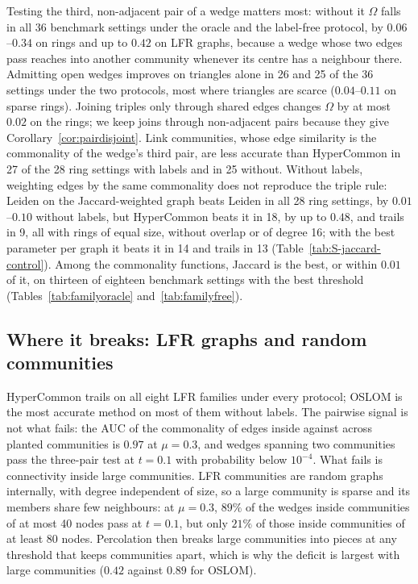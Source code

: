 Testing the third, non-adjacent pair of a wedge matters most: without it $\Omega$ falls
in all 36 benchmark settings under the oracle and the label-free protocol, by
$0.06$--$0.34$ on rings and up to $0.42$ on LFR graphs, because a wedge whose two edges
pass reaches into another community whenever its centre has a neighbour there. Admitting
open wedges improves on triangles alone in 26 and 25 of the 36 settings under the two
protocols, most where triangles are scarce ($0.04$--$0.11$ on sparse rings). Joining
triples only through shared edges changes $\Omega$ by at most $0.02$ on the rings; we
keep joins through non-adjacent pairs because they give
Corollary~\ref{cor:pairdisjoint}. Link communities, whose edge similarity is the
commonality of the wedge's third pair, are less accurate than HyperCommon in 27 of the 28 ring settings with labels and in 25 without. Without labels, weighting edges by the same commonality does not reproduce the triple rule: Leiden on the Jaccard-weighted graph beats Leiden in all 28 ring settings, by $0.01$--$0.10$ without labels, but HyperCommon beats it in 18, by up to $0.48$, and trails in 9, all with rings of equal size, without overlap or of degree 16; with the best parameter per graph it beats it in 14 and trails in 13 (Table~\ref{tab:S-jaccard-control}). Among the commonality functions, Jaccard is the
best, or within $0.01$ of it, on thirteen of eighteen benchmark settings with the best
threshold (Tables~\ref{tab:familyoracle} and~\ref{tab:familyfree}).

\subsection{Where it breaks: LFR graphs and random communities}
\label{sec:geometry}



HyperCommon trails on all eight LFR families under every protocol; OSLOM is the most
accurate method on most of them without labels. The pairwise signal is not what fails:
the AUC of the commonality of edges inside against across planted communities is $0.97$
at $\mu=0.3$, and wedges spanning two communities pass the three-pair test at $t=0.1$
with probability below $10^{-4}$. What fails is connectivity inside large communities.
LFR communities are random graphs internally, with degree independent of size, so a
large community is sparse and its members share few neighbours: at $\mu=0.3$, $89\%$ of
the wedges inside communities of at most 40 nodes pass at $t=0.1$, but only $21\%$ of
those inside communities of at least 80 nodes. Percolation then breaks large
communities into pieces at any threshold that keeps communities apart, which is why the
deficit is largest with large communities ($0.42$ against $0.89$ for OSLOM).

